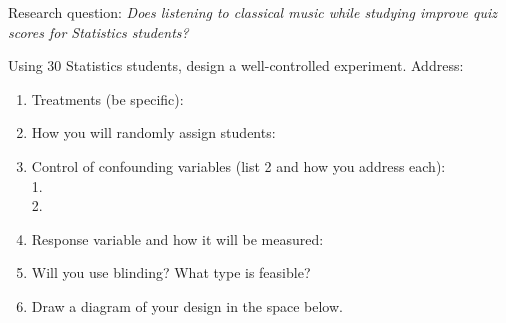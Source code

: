 \documentclass[10pt]{article}
\begin{document}
\begin{practicebox}
\small
Research question: \textit{Does listening to classical music while studying improve
quiz scores for Statistics students?}

\vspace{6pt}
Using 30 Statistics students, design a well-controlled experiment. Address:
\begin{enumerate}[leftmargin=1.5em, itemsep=6pt]
  \item Treatments (be specific): 
  \item How you will randomly assign students: 
  \item Control of confounding variables (list 2 and how you address each):\\
        1. \\[4pt]
        2. 
  \item Response variable and how it will be measured: 
  \item Will you use blinding? What type is feasible? 
  \item {}Draw a diagram of your design in the space below.
  \vspace{1.6in}
\end{enumerate}
\end{practicebox}
\end{document}
